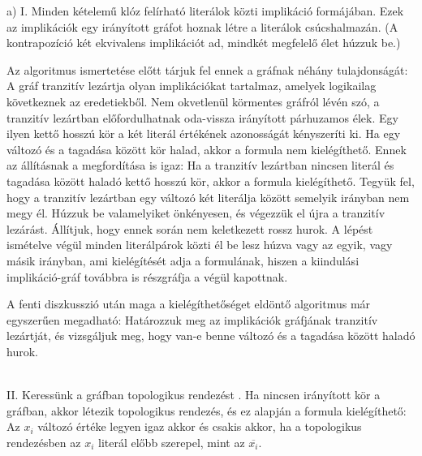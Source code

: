 \begin{Answer}
	a) I. Minden kételemű klóz felírható literálok közti implikáció formájában. Ezek az implikációk egy irányított gráfot hoznak létre a literálok csúcshalmazán. (A kontrapozíció két ekvivalens implikációt ad, mindkét megfelelő élet húzzuk be.)
	
	Az algoritmus ismertetése előtt tárjuk fel ennek a gráfnak néhány tulajdonságát: A gráf tranzitív lezártja olyan implikációkat tartalmaz, amelyek logikailag következnek az eredetiekből. Nem okvetlenül körmentes gráfról lévén szó, a tranzitív lezártban előfordulhatnak oda-vissza irányított párhuzamos élek.  Egy ilyen kettő hosszú kör a két literál értékének azonosságát kényszeríti ki. Ha egy változó és a tagadása között kör halad, akkor a formula nem kielégíthető. Ennek az állításnak a megfordítása is igaz: Ha a tranzitív lezártban nincsen literál és tagadása között haladó kettő hosszú kör, akkor a formula kielégíthető.  Tegyük fel, hogy a tranzitív lezártban egy változó két literálja között semelyik irányban nem megy él. Húzzuk be valamelyiket önkényesen, és végezzük el újra a tranzitív lezárást. Állítjuk, hogy ennek során nem keletkezett rossz hurok.  A lépést ismételve végül minden literálpárok közti él be lesz húzva vagy az egyik, vagy másik irányban, ami kielégítését adja a formulának, hiszen a kiindulási implikáció-gráf továbbra is részgráfja a végül kapottnak. 
	
	A fenti diszkusszió után maga a kielégíthetőséget eldöntő algoritmus már egyszerűen megadható: Határozzuk meg az implikációk gráfjának tranzitív lezártját, és vizsgáljuk meg, hogy van-e benne változó és a tagadása között haladó hurok.
	
	\\
	
	II. Keressünk a gráfban topologikus rendezést . Ha nincsen irányított kör a gráfban, akkor létezik topologikus rendezés, és ez alapján a formula kielégíthető: Az $x_i$ változó értéke legyen igaz akkor és csakis akkor, ha a topologikus rendezésben az $x_i$ literál előbb szerepel, mint az $\overline{x_i}$.
	

\end{Answer}

